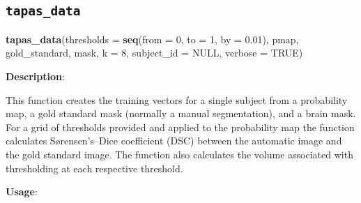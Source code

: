 \documentclass[]{article}
\newenvironment{Shaded}{\begin{snugshade}}{\end{snugshade}}
\newcommand{\DataTypeTok}[1]{\textcolor[rgb]{0.13,0.29,0.53}{#1}}
\newcommand{\DecValTok}[1]{\textcolor[rgb]{0.00,0.00,0.81}{#1}}
\newcommand{\FloatTok}[1]{\textcolor[rgb]{0.00,0.00,0.81}{#1}}
\newcommand{\KeywordTok}[1]{\textcolor[rgb]{0.13,0.29,0.53}{\textbf{#1}}}
\newcommand{\NormalTok}[1]{#1}
\newcommand{\OtherTok}[1]{\textcolor[rgb]{0.56,0.35,0.01}{#1}}
\begin{document}
\hypertarget{tapas_data}{%
\subsection{\texorpdfstring{\texttt{tapas\_data}}{tapas\_data}}\label{tapas_data}}

\begin{Shaded}
\begin{Highlighting}[]
\KeywordTok{tapas_data}\NormalTok{(}\DataTypeTok{thresholds =} \KeywordTok{seq}\NormalTok{(}\DataTypeTok{from =} \DecValTok{0}\NormalTok{, }\DataTypeTok{to =} \DecValTok{1}\NormalTok{, }\DataTypeTok{by =} \FloatTok{0.01}\NormalTok{),}
\NormalTok{           pmap,}
\NormalTok{           gold_standard,}
\NormalTok{           mask,}
           \DataTypeTok{k =} \DecValTok{8}\NormalTok{,}
           \DataTypeTok{subject_id =} \OtherTok{NULL}\NormalTok{,}
           \DataTypeTok{verbose =} \OtherTok{TRUE}\NormalTok{)}
\end{Highlighting}
\end{Shaded}

\textbf{Description}:

This function creates the training vectors for a single subject from a
probability map, a gold standard mask (normally a manual segmentation),
and a brain mask. For a grid of thresholds provided and applied to the
probability map the function calculates Sørensen's--Dice coefficient
(DSC) between the automatic image and the gold standard image. The
function also calculates the volume associated with thresholding at each
respective threshold.

\textbf{Usage}:
\end{document}
